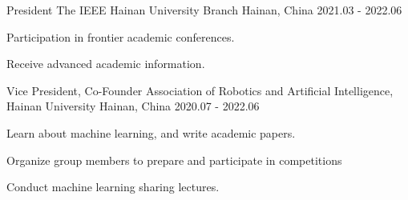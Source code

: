 

\begin{cventries}
\cventry
{President} %
{The IEEE Hainan University Branch} %
{Hainan, China} %
{2021.03 - 2022.06} %
{
	\begin{cvitems} %
		\item{Participation in frontier academic conferences.}
		\item{Receive advanced academic information.}
	\end{cvitems}
}


\cventry
{Vice President, Co-Founder} %
{Association of Robotics and Artificial Intelligence, Hainan University} %
{Hainan, China} %
{2020.07 - 2022.06} %
{
	\begin{cvitems} %
		\item {Learn about machine learning, and write academic papers.}
		\item {Organize group members to prepare and participate in competitions}
		\item {Conduct machine learning sharing lectures.}
	\end{cvitems}
}


\end{cventries}
